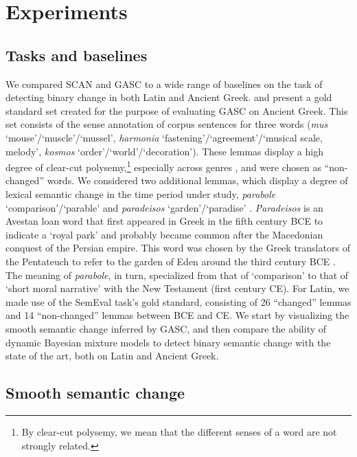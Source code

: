 \documentclass[output=paper]{langscibook}
\begin{document}
\section{Experiments}
\label{sec:results}


\subsection{Tasks and baselines}
We compared SCAN and GASC to a wide range of baselines on the task of detecting binary change in both Latin and Ancient Greek. \citet{perrone-etal-2019-gasc} and \citet{annodata} present a gold standard set created for the purpose of evaluating GASC on Ancient Greek. This set consists of the sense annotation of corpus sentences for three words (\emph{mus} `mouse'\slash`muscle'\slash`mussel', \emph{harmonia} `fastening'\slash`agreement'\slash`musical scale, melody', \emph{kosmos} `order'\slash`world'\slash`decoration'). These lemmas display a high degree of clear-cut polysemy,\footnote{By clear-cut polysemy, we mean that the different senses of a word are not strongly related.} especially across genres \citep{liddell:1996, pollitt_ancient_1974}, and were chosen as ``non-changed'' words. We considered two additional lemmas, which display a degree of lexical semantic change in the time period under study, \emph{parabole} `comparison'/`parable' and \emph{paradeisos} `garden'/`paradise' \citep{mcgillivray2019computational}. \emph{Paradeisos} is an Avestan loan word that first appeared in Greek in the fifth century BCE to indicate a `royal park' and probably became common after the Macedonian conquest of the Persian empire. This word was chosen by the Greek translators of the Pentateuch to refer to the garden of Eden around the third century BCE \citep{christidis_2007}. The meaning of  \emph{parabole}, in turn, specialized from that of `comparison' to that of `short moral narrative' with the New Testament (first century CE). For Latin, we made use of the SemEval task's gold standard, consisting of 26 ``changed'' lemmas and 14 ``non-changed'' lemmas between BCE and CE. We start by visualizing the smooth semantic change inferred by GASC, and then compare the ability of dynamic Bayesian mixture models to detect binary semantic change with the state of the art, both on Latin and Ancient Greek.



\subsection{Smooth semantic change}
\end{document}
